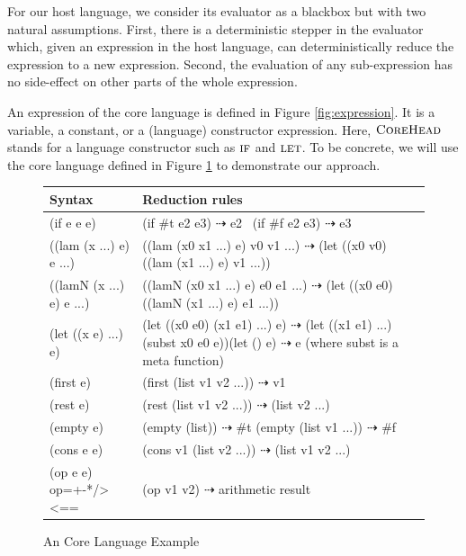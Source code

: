 For our host language, we consider its evaluator as a blackbox  but with two natural assumptions. First, there is a deterministic stepper in the evaluator which, given an expression in the host language, can deterministically reduce the expression to a new expression. Second, the evaluation of any sub-expression has no side-effect on other parts of the whole expression.

An expression of the core language is defined in Figure \ref{fig:expression}. It is a variable, a constant, or a (language) constructor expression. Here, $\mbox{\sc CoreHead}$ stands for a language constructor such as $\mbox{\sc if}$ and $\mbox{\sc let}$. To be concrete, we will use the core language defined in Figure \ref{fig:core} to demonstrate our approach.

\begin{figure}[t]
\begin{center}
\begin{tabularx}{.9\textwidth}%
{|>{\setlength{\hsize}{.4\hsize}\centering\arraybackslash}X  |>{\setlength{\hsize}{1.6\hsize}\centering\arraybackslash}X|}
\hline
Syntax & Reduction rules \\ \hline
(if e e e) &\qquad\qquad\qquad(if \#t e2 e3) $\dashrightarrow$ e2 \newline ~(if \#f e2 e3) $\dashrightarrow$ e3\\ \hline
((lam (x ...) e) e ...) & ((lam (x0 x1 ...) e) v0 v1 ...) $\dashrightarrow$ (let ((x0 v0) ((lam (x1 ...) e) v1 ...))\\ \hline
((lamN (x ...) e) e ...) & ((lamN (x0 x1 ...) e) e0 e1 ...) $\dashrightarrow$ (let ((x0 e0) ((lamN (x1 ...) e) e1 ...))\\ \hline
(let ((x e) ...) e) & (let ((x0 e0) (x1 e1) ...) e) $\dashrightarrow$ (let ((x1 e1) ...) (subst x0 e0 e))\newline (let () e)  $\dashrightarrow$ e (where subst is a meta function)\\ \hline
(first e) & (first (list v1 v2 ...)) $\dashrightarrow$ v1\\ \hline
(rest e) & (rest (list v1 v2 ...)) $\dashrightarrow$ (list v2 ...)\\ \hline
(empty e) & \qquad\qquad\qquad(empty (list)) $\dashrightarrow$ \#t \newline (empty (list v1 ...)) $\dashrightarrow$ \#f\\ \hline
(cons e e) & (cons v1 (list v2 ...)) $\dashrightarrow$ (list v1 v2 ...)\\ \hline
(op e e) \newline op=+-*/><== & (op v1 v2) $\dashrightarrow$ arithmetic result\\ \hline
\end{tabularx}
\end{center}
\caption{An Core Language Example}
\label{fig:core}
\end{figure}


